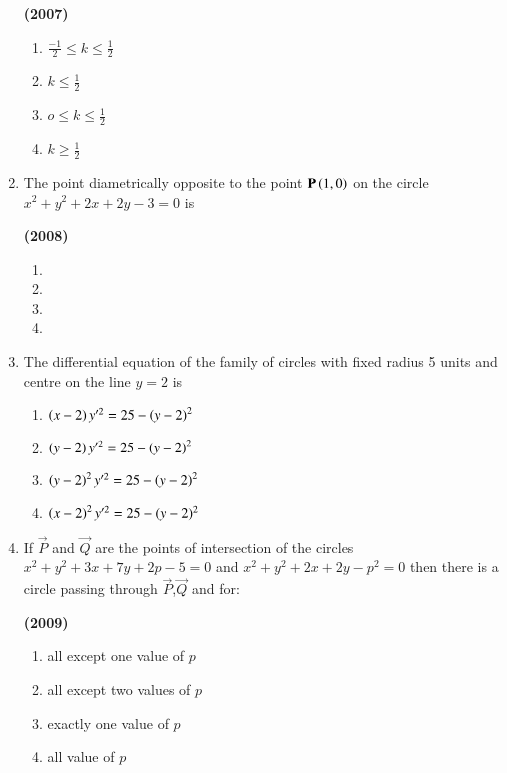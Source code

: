 \documentclass[journal,12pt,twocolumn]{IEEEtran}
\theoremstyle{remark}
\begin{document}
\begin{enumerate}[start=6]
\hfill{\textbf{(2007)}}

\begin{multicols}{2}
\begin{enumerate}[label=(\alph*)]
\item $\frac{-1}{2} \le k \le \frac{1}{2}$
\item $k \le \frac{1}{2}$
\item $o \le k \le \frac{1}{2}$
\item $k \ge \frac{1}{2}$
\end{enumerate}
\end{multicols}
\item The point diametrically opposite to the point $\mathbf{P}\left(1,0\right)$ on the circle $x^2+y^2+2x+2y-3=0$ is 

\hfill{\textbf{(2008)}}

\begin{multicols}{2}
\begin{enumerate}[label=(\alph*)]
\item {}
\item {}
\item {}
\item {}
\end{enumerate}
\end{multicols}
\item The differential equation of the family of circles with fixed radius 5 units and centre on the line $y=2$ is


\begin{enumerate}[label=(\alph*)]
\item $\left(x-2\right)y^{\prime 2}=25-\left(y-2\right)^2$
\item $\left(y-2\right)y^{\prime 2}=25-\left(y-2\right)^2$
\item $\left(y-2\right)^2y^{\prime 2}=25-\left(y-2\right)^2$
\item $\left(x-2\right)^2y^{\prime 2}=25-(y-2)^2$
\end{enumerate}
\item If $\vec{P}$ and $\vec{Q}$ are the points of intersection of the circles $x^2+y^2+3x+7y+2p-5=0$ and $x^2+y^2+2x+2y-p^2=0$ then there is a circle passing through $\vec{P}$,$\vec{Q}$ and  for:

\hfill{\textbf{(2009)}}

\begin{enumerate}[label=(\alph*)]
\item all except one value of $p$
\item all except two values of $p$
\item exactly one value of $p$
\item all value of $p$
\end{enumerate}
\end{enumerate}
\end{document}
